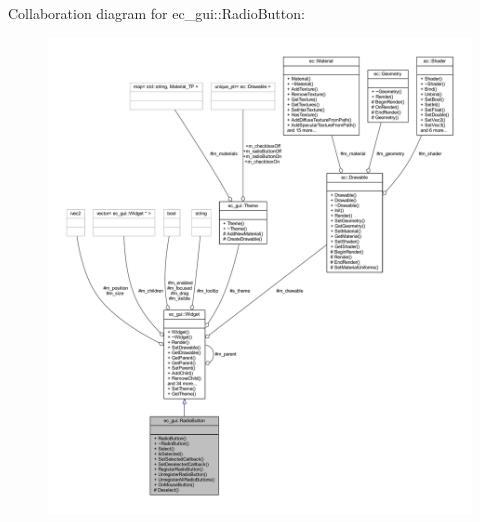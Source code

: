 Collaboration diagram for ec\+\_\+gui\+:\+:Radio\+Button\+:
\nopagebreak
\begin{figure}[H]
\begin{center}
\leavevmode
\includegraphics[width=350pt]{classec__gui_1_1_radio_button__coll__graph}
\end{center}
\end{figure}
